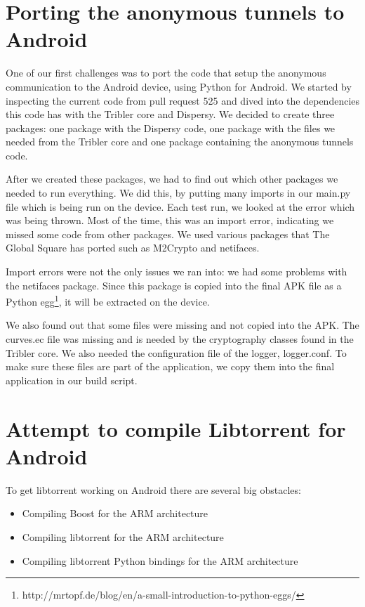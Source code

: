 	\section{Porting the anonymous tunnels to Android}
		One of our first challenges was to port the code that setup the anonymous communication to the Android device, using Python for Android. We started by inspecting the current code from pull request 525 and dived into the dependencies this code has with the Tribler core and Dispersy. We decided to create three packages: one package with the Dispersy code, one package with the files we needed from the Tribler core and one package containing the anonymous tunnels code.
		
		After we created these packages, we had to find out which other packages we needed to run everything. We did this, by putting many imports in our main.py file which is being run on the device. Each test run, we looked at the error which was being thrown. Most of the time, this was an import error, indicating we missed some code from other packages. We used various packages that The Global Square has ported such as M2Crypto and netifaces.
		
		Import errors were not the only issues we ran into: we had some problems with the netifaces package. Since this package is copied into the final APK file as a Python egg\footnote{http://mrtopf.de/blog/en/a-small-introduction-to-python-eggs/}, it will be extracted on the device.
		
		We also found out that some files were missing and not copied into the APK. The curves.ec file was missing and is needed by the cryptography classes found in the Tribler core. We also needed the configuration file of the logger, logger.conf. To make sure these files are part of the application, we copy them into the final application in our build script.
		
	\section{Attempt to compile Libtorrent for Android}
		To get libtorrent working on Android there are several big obstacles:
		\begin{itemize}
			\item Compiling Boost for the ARM architecture
			\item Compiling libtorrent for the ARM architecture
			\item Compiling libtorrent Python bindings for the ARM architecture
		\end{itemize}
		
